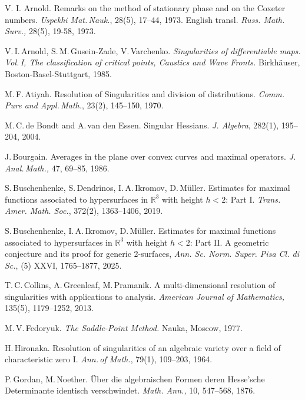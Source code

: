 \documentclass[a4paper, 11pt]{article}
\theoremstyle{plain}
\theoremstyle{definition}
\theoremstyle{lemma}
\theoremstyle{Remark}
\theoremstyle{proposition}
\theoremstyle{corollary}
\theoremstyle{example}
\theoremstyle{assumption}
\begin{document}
\begin{thebibliography}{}

 V. I. Arnold. Remarks on the method of stationary phase and on the Coxeter numbers.
\textit{Uspekhi Mat.\,Nauk.}, 28(5), 17--44, 1973. English transl. \textit{Russ. Math. Surv.,} 28(5), 19-58, 1973.

V.\,I.\,Arnold, S.\,M.\,Gusein-Zade, V.\,Varchenko.
\textit{Singularities of differentiable maps. Vol.\,I, The classification of critical points, Caustics  and Wave Fronts.}
 Birkh\"{a}user, Boston-Basel-Stuttgart, 1985.

 M.\,F.\,Atiyah. Resolution of Singularities and division of distributions. \textit{Comm.\,Pure and Appl.\,Math.}, 23(2), 145--150, 1970.



 M.\,C.\,de Bondt and A.\,van den Essen. Singular Hessians. \textit{J. Algebra}, 282(1), 195--204, 2004.

 J.\,Bourgain. Averages in the plane over convex curves and maximal operators. \textit{J.\,Anal.\,Math.,} 47, 69--85, 1986.


 S.\,Buschenhenke, S.\,Dendrinos, I.\,A.\,Ikromov,  D.\,M\"uller. Estimates for maximal functions associated to hypersurfaces in $\mathbb{R}^3$
 with height $h < 2$: Part I. \textit{Trans. Amer. Math.
Soc.}, 372(2), 1363--1406, 2019.

 S.\,Buschenhenke, I.\,A.\,Ikromov, D.\,M\"uller. Estimates for maximal functions associated
to hypersurfaces in $\mathbb{R}^3$ with height $h < 2$: Part II. A geometric conjecture and its proof for
generic 2-surfaces, \textit{Ann. Sc. Norm. Super. Pisa Cl. di Sc.}, (5) XXVI, 1765--1877, 2025.

T.\,C.\,Collins,  A.\,Greenleaf,    M.\,Pramanik.
A multi-dimensional resolution of singularities with applications to analysis.
\textit{American Journal of Mathematics,} 135(5), 1179--1252, 2013.

M.\,V.\,Fedoryuk. \textit{ The Saddle-Point Method.} Nauka, Moscow, 1977.

H.\,Hironaka. Resolution of singularities of an algebraic variety over a field of characteristic zero I.  \textit{Ann.\,of Math.}, 79(1),  109--203, 1964.

 P.\,Gordan, M.\,Noether. \"Uber die algebraischen Formen deren Hesse'sche Determinante identisch verschwindet. \textit{Math. Ann.,} 10, 547--568, 1876.


\end{thebibliography}
\end{document}
